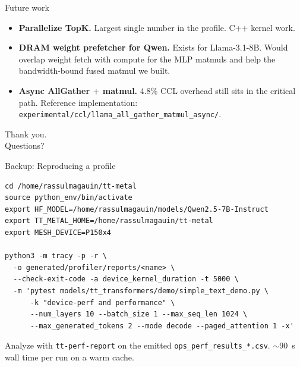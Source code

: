 \documentclass[aspectratio=169,10pt]{beamer}
\begin{document}
\begin{frame}{Future work}
  \begin{itemize}
    \item \textbf{Parallelize TopK.} Largest single number in the
          profile. C++ kernel work.
    \item \textbf{DRAM weight prefetcher for Qwen.} Exists for
          Llama-3.1-8B. Would overlap weight fetch with compute for
          the MLP matmuls and help the bandwidth-bound fused matmul we
          built.
    \item \textbf{Async AllGather $+$ matmul.} 4.8\% CCL overhead still
          sits in the critical path. Reference implementation:
          \texttt{experimental/ccl/llama\_all\_gather\_matmul\_async/}.
  \end{itemize}
\end{frame}

\begin{frame}[standout]
  Thank you.\\[0.5em]
  Questions?
\end{frame}

\appendix

\begin{frame}[fragile]{Backup: Reproducing a profile}
\begin{lstlisting}
cd /home/rassulmagauin/tt-metal
source python_env/bin/activate
export HF_MODEL=/home/rassulmagauin/models/Qwen2.5-7B-Instruct
export TT_METAL_HOME=/home/rassulmagauin/tt-metal
export MESH_DEVICE=P150x4

python3 -m tracy -p -r \
  -o generated/profiler/reports/<name> \
  --check-exit-code -a device_kernel_duration -t 5000 \
  -m 'pytest models/tt_transformers/demo/simple_text_demo.py \
      -k "device-perf and performance" \
      --num_layers 10 --batch_size 1 --max_seq_len 1024 \
      --max_generated_tokens 2 --mode decode --paged_attention 1 -x'
\end{lstlisting}
  \vfill
  Analyze with \texttt{tt-perf-report} on the emitted
  \texttt{ops\_perf\_results\_*.csv}. $\sim$90~s wall time per run on a
  warm cache.
\end{frame}
\end{document}
